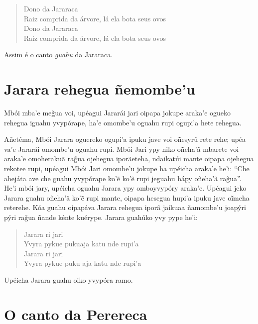 \begin{verse}
Dono da Jararaca\\
Raiz comprida da árvore, lá ela bota seus ovos\\
Dono da Jararaca\\
Raiz comprida da árvore, lá ela bota seus ovos
\end{verse}

Assim é o canto \emph{guahu} da Jararaca.

\chapter{Jarara rehegua ñemombe'u}

Mbói mba'e meg̃ua voi, upéagui Jararái jari oipapa jokupe araka'e ogueko
rehegua iguahu yvypórape, ha'e omombe'u oguahu rupi ogupi'a hete
rehegua.


Añetéma, Mbói Jarara oguereko ogupi'a ipuku jave voi oñesyrũ rete rehe;
upéa va'e Jararái omombe'u oguahu rupi. Mbói Jari ypy niko oñeha'ã
mbarete voi araka'e omoherakuã rag̃ua ojehegua iporãeteha, ndaikatúi
mante oipapa ojehegua rekotee rupi, upéagui Mbói Jari omombe'u jokupe ha
upéicha araka'e he'i: ``Che ahejáta ave che guahu yvypórape ko'ẽ ko'ẽ
rupi jeguahu hápy oñeha'ã rag̃ua''. He'i mbói jary, upéicha oguahu Jarara
ypy omboyvypóry araka'e. Upéagui jeko Jarara guahu oñeha'ã ko'ẽ rupi
mante, oipapa hesegua hupi'a ipuku jave oĩmeha reterehe. Kóa guahu
oipapáva Jarara rehegua iporã jaikuaa ñamombe'u joapýri pýri rag̃ua ñande
kénte kuérype. Jarara guahúko yvy pype he'i:

\begin{verse}
Jarara ri jari\\
Yvyra pykue puku\footnotemark aja katu nde rupi'a\\
Jarara ri jari\\
Yvyra pykue puku aja katu nde rupi'a
\end{verse}



Upéicha Jarara guahu oiko yvypóra ramo.


\chapter{O canto da Perereca}

